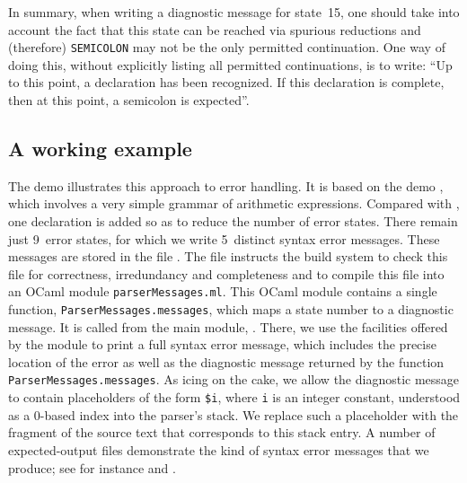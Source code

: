 \documentclass[onecolumn,11pt,nocopyrightspace,preprint]{sigplanconf}
\begin{document}
In summary, when writing a diagnostic message for state~15, one should take
into account the fact that this state can be reached via spurious reductions
and (therefore) \verb+SEMICOLON+ may not be the only permitted continuation.
One way of doing this, without explicitly listing all permitted continuations,
is to write: ``Up to this point, a declaration has been recognized. If this
declaration is complete, then at this point, a semicolon is expected''.


\subsection{A working example}
\label{sec:errors:example}

The demo  illustrates this approach to error
handling. It is based on the demo , which involves a very
simple grammar of arithmetic expressions. Compared with ,
one \donerrorreduce declaration is added so as to reduce the number of error
states. There remain just 9~error states, for which we write 5~distinct syntax
error messages. These messages are stored in the file
.
%
The file  instructs the build system to
check this file for correctness, irredundancy and completeness and to compile
this file into an OCaml module \verb+parserMessages.ml+.
%
This OCaml module contains a single function, \verb+ParserMessages.messages+,
which maps a state number to a diagnostic message. It is called from the main
module, .
%
There, we use the facilities offered by the module
\menhirliberrorreports to print a full syntax error message,
which includes the precise location of the error as well as
the diagnostic message returned by
the function \verb+ParserMessages.messages+.
%
As icing on the cake, we allow the diagnostic message to contain placeholders
of the form
\verb+$i+, where \verb+i+ is an integer constant, understood as a 0-based
index into the parser's stack. We replace such a placeholder with the fragment
of the source text that corresponds to this stack entry.
%
A number of expected-output files demonstrate the kind of syntax error
messages that we produce; see for instance
 and
.
\end{document}
